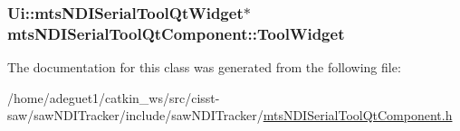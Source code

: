 \hypertarget{classmts_n_d_i_serial_tool_qt_component_af967ad37bf503470a35cb6fd9b6bd247}{
\subsubsection[{Tool\-Widget}]{\setlength{\rightskip}{0pt plus 5cm}Ui\-::mts\-N\-D\-I\-Serial\-Tool\-Qt\-Widget$\ast$ mts\-N\-D\-I\-Serial\-Tool\-Qt\-Component\-::\-Tool\-Widget\hspace{0.3cm}{\ttfamily [protected]}}}\label{classmts_n_d_i_serial_tool_qt_component_af967ad37bf503470a35cb6fd9b6bd247}


The documentation for this class was generated from the following file\-:\begin{DoxyCompactItemize}
\item 
/home/adeguet1/catkin\-\_\-ws/src/cisst-\/saw/saw\-N\-D\-I\-Tracker/include/saw\-N\-D\-I\-Tracker/\hyperlink{mts_n_d_i_serial_tool_qt_component_8h}{mts\-N\-D\-I\-Serial\-Tool\-Qt\-Component.\-h}\end{DoxyCompactItemize}
